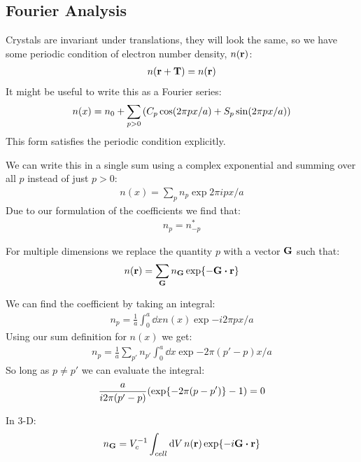 \documentclass[12pt]{article}
\begin{document}
\subsection{Fourier Analysis}
Crystals are invariant under translations, they will look the same, so we have some periodic condition of electron number density, $n(\vb{r})$:
\begin{align*}
  n(\vb{r+T})=n(\vb{r})
\end{align*}
It might be useful to write this as a Fourier series:
\begin{align*}
  n(x)=n_0+\sum_{p>0}\qty(C_p\cos(2\pi px/a)+S_p\sin(2\pi px/a))
\end{align*}
This form satisfies the periodic condition explicitly.

We can write this in a single sum using a complex exponential and summing over all $p$ instead of just $p>0$:
\begin{align*}
  n(x)=\sum_pn_p\exp{2\pi ipx/a}
\end{align*}
Due to our formulation of the coefficients we find that:
\begin{align*}
  n_p=n^*_{-p}
\end{align*}

For multiple dimensions we replace the quantity $p$ with a vector $\vb{G}$ such that:
\begin{align*}
  n(\vb{r})=\sum_{\vb{G}}n_{\vb{G}}\exp{-\vb{G}\vdot\vb{r}}
\end{align*}

We can find the coefficient by taking an integral:
\begin{align*}
  n_p=\frac{1}{a}\int_0^a\dd{x}n(x)\exp{-i2\pi px/a}
\end{align*}
Using our sum definition for $n(x)$ we get:
\begin{align*}
  n_p=\frac{1}{a}\sum_{p'}n_{p'}\int_0^a\dd{x}\exp{-2\pi(p'-p)x/a}
\end{align*}
So long as $p\neq p'$ we can evaluate the integral:
\begin{align*}
  \frac{a}{i2\pi(p'-p)}\qty(\exp{-2\pi(p-p')}-1)=0
\end{align*}

In 3-D:
\begin{align*}
  n_{\vb{G}}=V_c^{-1}\int_{cell}\dd{V}n(\vb{r})\exp{-i\vb{G}\vdot\vb{r}}
\end{align*}
\end{document}

